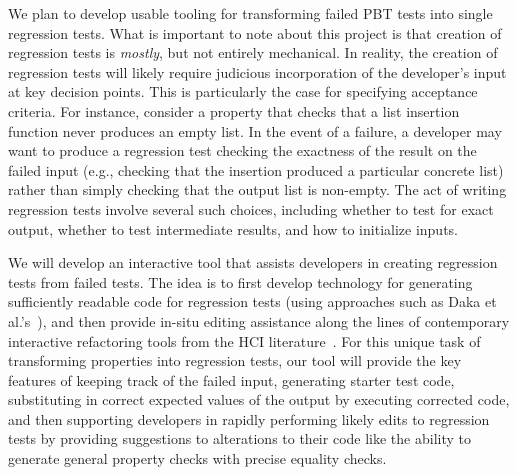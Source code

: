 We plan to develop usable tooling for transforming failed PBT tests into single
regression tests. What is important to note about this project is that creation
of regression tests is \emph{mostly}, but not entirely mechanical. In reality,
the creation of regression tests will likely require judicious incorporation of
the developer's input at key decision points. This is particularly the case for
specifying acceptance criteria. For instance, consider a property that checks
that a list insertion function never produces an empty list. In the event of a
failure, a developer may want to produce a regression test checking the
exactness of the result on the failed input (e.g., checking that the insertion
produced a particular concrete list) rather than simply checking that the output
list is non-empty. The act of writing regression tests involve several such
choices, including whether to test for exact output, whether to test
intermediate results, and how to initialize inputs.

We will develop an interactive tool that assists developers in creating
regression tests from failed tests. The idea is to first develop
technology for generating sufficiently readable code for regression tests (using
approaches such as Daka et al.'s~\cite{ref:daka2015modeling}), and then provide
in-situ editing assistance along the lines of contemporary interactive
refactoring tools from the HCI
literature~\cite{ref:head2018interactive,ref:barik2016quick,ref:murphyhill2008refactoring,ref:lee2013draganddrop}.
For this unique task of transforming properties into regression tests,
our tool will provide the key features of keeping track of the failed input,
generating starter test code, substituting in correct expected values of the
output by executing corrected code, and then supporting developers in rapidly
performing likely edits to regression tests by providing suggestions to
alterations to their code like the ability to generate general property checks
with precise equality checks.



